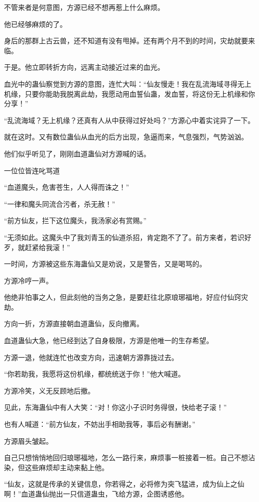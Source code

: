 \begin{this_body}
不管来者是何意图，方源已经不想再惹上什么麻烦。

他已经够麻烦的了。

身后的那群上古云兽，还不知道有没有甩掉。还有两个月不到的时间，灾劫就要来临。

于是。他立即转折方向，远离主动接近过来的血光。

血光中的蛊仙察觉到方源的意图，连忙大叫：“仙友慢走！我在乱流海域寻得无上机缘，只要你能助我脱离此劫，我愿动用血誓仙蛊，发血誓，将这份无上机缘和你分享！”

“乱流海域？无上机缘？还真有人从中获得过好处吗？”方源心中着实诧异了一下。

就在这时。又有数位蛊仙从血光的后方出现，急逼而来，气息强烈，气势汹汹。

他们似乎听见了，刚刚血道蛊仙对方源喊的话。

一位位皆连叱骂道

“血道魔头，危害苍生，人人得而诛之！”

“一律和魔头同流合污者，杀无赦！”

“前方仙友，拦下这位魔头，我汤家必有赏赐。”

“无须如此。这魔头中了我刘青玉的仙道杀招，肯定跑不了了。前方来者，若识好歹，就赶紧给我滚！”

一时间，方源被这些东海蛊仙又是劝说，又是警告，又是喝骂的。

方源冷哼一声。

他绝非怕事之人，但此刻他的当务之急，是要赶往北原琅琊福地，好应付仙窍灾劫。

方向一折，方源直接朝血道蛊仙，反向撤离。

血道蛊仙大急，他已经到达了自身极限，方源是他唯一的生存希望。

方源一退，他就连忙也改变方向，迅速朝方源靠拢过去。

“你若助我，我愿将这份机缘，都统统送于你！”他大喊道。

方源冷笑，义无反顾地后撤。

见此，东海蛊仙中有人大笑：“对！你这小子识时务得很，快给老子滚！”

也有人喊道：“前方仙友，不妨出手相助我等，事后必有酬谢。”

方源眉头皱起。

自己只想悄悄地回归琅琊福地，怎么一路行来，麻烦事一桩接着一桩。自己不想沾染，但这些麻烦却主动来黏上他。

“仙友，这就是传承的关键信息，你若得之，必将修为突飞猛进，成为仙上之仙啊！”血道蛊仙抛出一只信道蛊虫，飞给方源，企图诱惑他。


\end{this_body}
